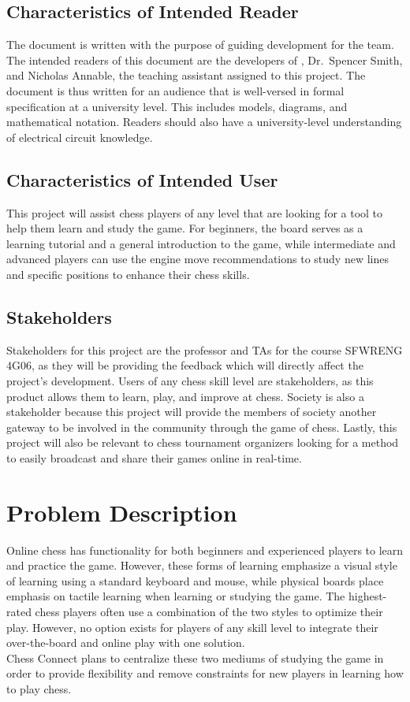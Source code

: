 \documentclass[12pt]{article}
\begin{document}
\subsection{Characteristics of Intended Reader}
{The document is written with the purpose of guiding development for the \progname{} team. The intended readers of this document 
are the developers of \progname{}, Dr.~Spencer Smith, and Nicholas Annable, the teaching assistant assigned to this project. The 
document is thus written for an audience that is well-versed in formal specification at a university level. This includes models, 
diagrams, and mathematical notation. Readers should also have a university-level understanding of electrical circuit knowledge.}

\subsection{Characteristics of Intended User}
{This project will assist chess players of any level that are looking for a tool to help them learn and study the game. For beginners, 
the board serves as a learning tutorial and a general introduction to the game, while intermediate and advanced players can use the 
engine move recommendations to study new lines and specific positions to enhance their chess skills.}

\subsection{Stakeholders}
{Stakeholders for this project are the professor and TAs for the course SFWRENG 4G06, as they will be providing the feedback which will directly affect the project’s development. 
Users of any chess skill level are stakeholders, as this product allows them to learn, play, and improve at chess. Society is also a stakeholder because this project will provide 
the members of society another gateway to be involved in the community through the game of chess. Lastly, this project will also be relevant to chess tournament organizers looking for a method to easily broadcast and share their games online in real-time.}

\newpage

\section{Problem Description}

{Online chess has functionality for both beginners and experienced players to
learn and practice the game. However, these forms of learning emphasize a
visual style of learning using a standard keyboard and mouse, while physical
boards place emphasis on tactile learning when learning or studying the game.
The highest-rated chess players often use a combination of the two styles to
optimize their play. However, no option exists for players of any skill level to
integrate their over-the-board and online play with one solution.\\
Chess Connect plans to centralize these two mediums of studying the game in
order to provide flexibility and remove constraints for new players in learning
how to play chess.}
\end{document}
